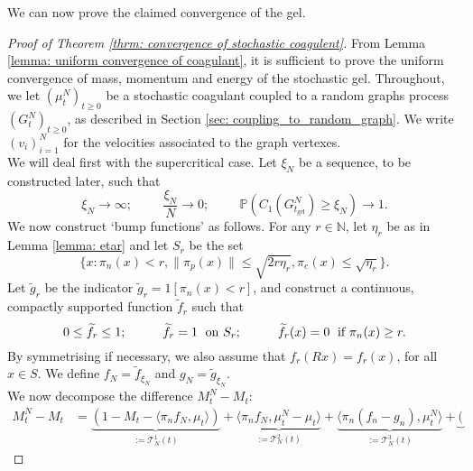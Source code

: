   
   We can now prove the claimed convergence of the gel.
   \begin{proof}[Proof of Theorem \ref{thrm: convergence of stochastic coagulent}] From Lemma \ref{lemma: uniform convergence of coagulant}, it is sufficient to prove the uniform convergence of mass, momentum and energy of the stochastic gel. Throughout, we let $(\mu^N_t)_{t\geq 0}$ be a stochastic coagulant coupled to a random graphs process $(G^N_t)_{t\geq 0}$, as described in Section \ref{sec: coupling_to_random_graph}. We write $(v_i)_{i=1}^N$ for the velocities associated to the graph vertexes. \medskip \\ We will deal first with the supercritical case. Let $\xi_N$ be a sequence, to be constructed later, such that \begin{equation}
       \xi_N\rightarrow \infty; \hspace{1cm} \frac{\xi_N}{N}\rightarrow 0; \hspace{1cm}\mathbb{P}(C_1(G^N_{t_\text{gel}})\geq \xi_N)\rightarrow 1.
   \end{equation}  We now construct `bump functions' as follows.  For any $r \in \mathbb{N}$, let $\eta_r$ be as in Lemma \ref{lemma: etar} and let $S_r$ be the set \begin{equation}\label{eq: choice of xiN}
       \{x: \pi_n(x)< r, \|\pi_p(x)\|\leq \sqrt{2r\eta_r}, \pi_e(x)\leq \sqrt{\eta_r}\}.
   \end{equation} Let $\widetilde{g}_r$ be the indicator $\widetilde{g}_r=1[\pi_n(x)< r]$, and construct a continuous, compactly supported function $\widetilde{f}_r$ such that \begin{equation}
      0\leq \widetilde{f}_r\leq 1;\hspace{1cm} \widetilde{f}_r=1 \hspace{0.1cm} \text{ on } S_r;\hspace{1cm} \widetilde{f}_r(x)=0 \hspace{0.1cm} \text{ if } \pi_n(x)\ge r.
   \end{equation} By symmetrising if necessary, we also assume that $f_r(Rx)=f_r(x)$, for all $x\in S$. We define $f_N=\widetilde{f}_{\xi_N}$ and $g_N=\widetilde{g}_{\xi_N}$. \medskip \\ We now decompose the difference $M^N_t-M_t:$ \begin{equation}\label{eq: decomposition of erorr}\begin{split} M^N_t-M_t &= \underbrace{(1-M_t-\langle \pi_n f_N, \mu_t\rangle)}_{:=\mathcal{T}^1_N(t)} + \underbrace{\langle \pi_n f_N, \mu^N_t-\mu_t\rangle}_{:=\mathcal{T}^2_N(t)} + \underbrace{\langle \pi_n (f_n-g_n), \mu^N_t\rangle}_{:=\mathcal{T}^3_N(t)} +\underbrace{(
}
\end{split}
\end{equation}
\end{proof}
